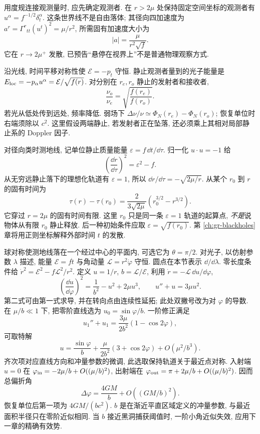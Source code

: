 
用度规连接观测量时, 应先确定观测者. 在 $r>2\mu$ 处保持固定空间坐标的观测者有 $u^\alpha=f^{-1/2}\delta^\alpha_t$. 这条世界线不是自由落体; 其径向四加速度为 $a^r=\Gamma^r{}_{tt}(u^t)^2=\mu/r^2$, 所需固有加速度大小为
\[
 |a|=\frac{\mu}{r^2\sqrt f}.
\]
它在 $r\to2\mu^+$ 发散, 已预告“悬停在视界上”不是普通物理观察方式.

沿光线, 时间平移对称性使 $\mathcal E=-p_t$ 守恒. 静止观测者量到的光子能量是 $E_{\rm loc}=-p_\alpha u^\alpha=\mathcal E/\sqrt{f(r)}$. 对分别在 $r_e,r_o$ 静止的发射者和接收者,
\begin{equation}
 \frac{\nu_o}{\nu_e}=\sqrt{\frac{f(r_e)}{f(r_o)}}.
 \label{eq:gr-grav-redshift}
\end{equation}
若光从低处传到远处, 频率降低. 弱场下 $\Delta\nu/\nu\simeq\Phi_N(r_e)-\Phi_N(r_o)$; 恢复单位时右端须除以 $c^2$. 这里假设两端静止, 若发射者正在坠落, 还必须乘上其相对局部静止系的 Doppler 因子.

对径向类时测地线, 记单位静止质量能量 $\varepsilon=f\,\dd t/\dd\tau$. 归一化 $u\cdot u=-1$ 给
\begin{equation}
 \left(\frac{\dd r}{\dd\tau}\right)^2=\varepsilon^2-f.
 \label{eq:gr-radial-infall}
\end{equation}
从无穷远静止落下的理想化轨道有 $\varepsilon=1$, 所以 $\dd r/\dd\tau=-\sqrt{2\mu/r}$. 从某个 $r_0$ 到 $r$ 的固有时间为
\begin{equation}
 \tau(r)-\tau(r_0)=\frac{2}{3\sqrt{2\mu}}\left(r_0^{3/2}-r^{3/2}\right).
 \label{eq:gr-infall-proper}
\end{equation}
它穿过 $r=2\mu$ 的固有时间有限. 这里 $r_0$ 只是同一条 $\varepsilon=1$ 轨道的起算点, \emph{不是}说物体从有限 $r_0$ 静止释放. 后一种初始条件应取 $\varepsilon=\sqrt{f(r_0)}$. 第 \ref{ch:gr-blackholes} 章将用正则坐标解释外部时间 $t$ 的发散.


球对称使测地线落在一个经过中心的平面内, 可选它为 $\theta=\pi/2$. 对光子, 以仿射参数 $\lambda$ 描述, 能量 $\mathcal E=f\dot t$ 与角动量 $\mathcal L=r^2\dot\varphi$ 守恒. 圆点在本节表示 $\dd/\dd\lambda$. 零长度条件给 $\dot r^2=\mathcal E^2-f\mathcal L^2/r^2$. 定义 $u=1/r$, $b=\mathcal L/\mathcal E$, 利用 $\dot r=-\mathcal L\,\dd u/\dd\varphi$,
\[
 \left(\frac{\dd u}{\dd\varphi}\right)^2=\frac1{b^2}-u^2+2\mu u^3,
 \qquad u''+u=3\mu u^2.
\]
第二式可由第一式求导, 并在转向点由连续性延拓; 此处双撇号改为对 $\varphi$ 的导数. 在 $\mu/b\ll1$ 下, 把零阶直线选为 $u_0=\sin\varphi/b$. 一阶修正满足
\[
 u_1''+u_1=\frac{3\mu}{2b^2}(1-\cos2\varphi),
\]
可取特解
\[
 u=\frac{\sin\varphi}b+\frac{\mu}{2b^2}(3+\cos2\varphi)
     +O(\mu^2/b^3).
\]
齐次项对应直线方向和冲量参数的微调, 此选取保持轨道关于最近点对称. 入射端 $u=0$ 在 $\varphi_{\rm in}=-2\mu/b+O((\mu/b)^2)$, 出射端在 $\varphi_{\rm out}=\pi+2\mu/b+O((\mu/b)^2)$. 因而总偏折角
\begin{equation}
 \Delta\varphi=\frac{4GM}b+O((GM/b)^2).
 \label{eq:gr-light-deflection}
\end{equation}
恢复单位后第一项为 $4GM/(bc^2)$. $b$ 是在渐近平直区域定义的冲量参数, 与最近面积半径只在零阶近似相同. 当 $b$ 接近黑洞捕获阈值时, 一阶小角近似失效, 应用下一章的精确有效势.

